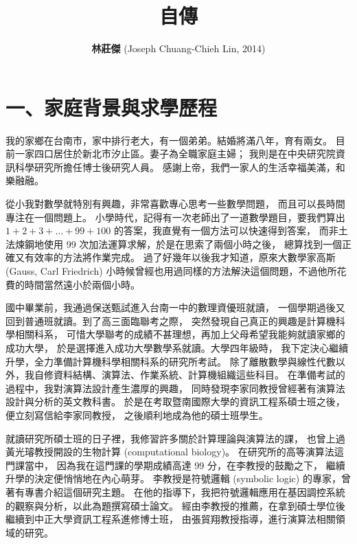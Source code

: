\documentclass[10pt,a4paper]{article}
\begin{document}
\onehalfspacing

\title{\bf 自傳}
\author{\large {\bf 林莊傑} (Joseph Chuang-Chieh Lin, 2014)}
\date{}

\maketitle



\section*{\bf\large 一、家庭背景與求學歷程}
\label{sec:personal-information}

\setcounter{page}{1}


我的家鄉在台南市，家中排行老大，有一個弟弟。結婚將滿八年，育有兩女。
目前一家四口居住於新北市汐止區。妻子為全職家庭主婦；
我則是在中央研究院資訊科學研究所擔任博士後研究人員。
感謝上帝，我們一家人的生活幸福美滿，和樂融融。


從小我對數學就特別有興趣，非常喜歡專心思考一些數學問題，
而且可以長時間專注在一個問題上。
小學時代，記得有一次老師出了一道數學題目，要我們算出 $1+2+3+\ldots + 
99 + 100$ 的答案，我直覺有一個方法可以快速得到答案，
而非土法煉鋼地使用 99 次加法運算求解，於是在思索了兩個小時之後，
總算找到一個正確又有效率的方法將作業完成。
過了好幾年以後我才知道，原來大數學家高斯 (Gauss, Carl Friedrich) 
小時候曾經也用過同樣的方法解決這個問題，不過他所花費的時間當然遠小於兩個小時。


國中畢業前，我通過保送甄試進入台南一中的數理資優班就讀，
一個學期過後又回到普通班就讀。到了高三面臨聯考之際，
突然發現自己真正的興趣是計算機科學相關科系，
可惜大學聯考的成績不甚理想，再加上父母希望我能夠就讀家鄉的成功大學，
於是選擇進入成功大學數學系就讀。大學四年級時，
我下定決心繼續升學，全力準備計算機科學相關科系的研究所考試。
除了離散數學與線性代數以外，我自修資料結構、演算法、作業系統、計算機組織這些科目。
在準備考試的過程中，我對演算法設計產生濃厚的興趣，
同時發現李家同教授曾經著有演算法設計與分析的英文教科書。
於是在考取暨南國際大學的資訊工程系碩士班之後，便立刻寫信給李家同教授，
之後順利地成為他的碩士班學生。


就讀研究所碩士班的日子裡，我修習許多關於計算理論與演算法的課，
也曾上過黃光璿教授開設的生物計算 (computational biology)。
在研究所的高等演算法這門課當中，
因為我在這門課的學期成績高達 99 分，在李教授的鼓勵之下，
繼續升學的決定便悄悄地在內心萌芽。
李教授是符號邏輯 (symbolic logic) 的專家，曾著有專書介紹這個研究主題。
在他的指導下，我把符號邏輯應用在基因調控系統的觀察與分析，以此為題撰寫碩士論文。
經由李教授的推薦，在拿到碩士學位後繼續到中正大學資訊工程系進修博士班，
由張貿翔教授指導，進行演算法相關領域的研究。
\end{document}
